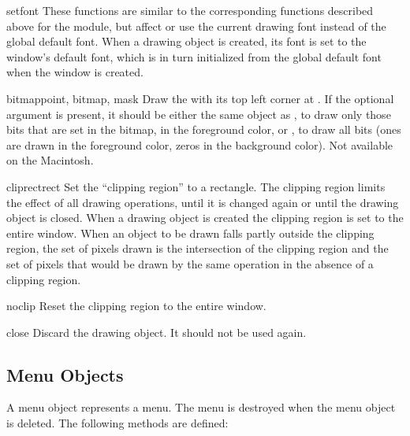 \begin{funcdesc}{setfont}{}
These functions are similar to the corresponding functions described
above for the
module, but affect or use the current drawing font instead of
the global default font.
When a drawing object is created, its font is set to the window's
default font, which is in turn initialized from the global default
font when the window is created.
\end{funcdesc}

\begin{funcdesc}{bitmap}{point, bitmap, mask}
Draw the  with its top left corner at .
If the optional  argument is present, it should be either
the same object as , to draw only those bits that are set
in the bitmap, in the foreground color, or , to draw all
bits (ones are drawn in the foreground color, zeros in the background
color).
Not available on the Macintosh.
\end{funcdesc}

\begin{funcdesc}{cliprect}{rect}
Set the ``clipping region'' to a rectangle.
The clipping region limits the effect of all drawing operations, until
it is changed again or until the drawing object is closed.  When a
drawing object is created the clipping region is set to the entire
window.  When an object to be drawn falls partly outside the clipping
region, the set of pixels drawn is the intersection of the clipping
region and the set of pixels that would be drawn by the same operation
in the absence of a clipping region.
\end{funcdesc}

\begin{funcdesc}{noclip}{}
Reset the clipping region to the entire window.
\end{funcdesc}

\begin{funcdesc}{close}{}
Discard the drawing object.  It should not be used again.
\end{funcdesc}

\subsection{Menu Objects}

A menu object represents a menu.
The menu is destroyed when the menu object is deleted.
The following methods are defined:

